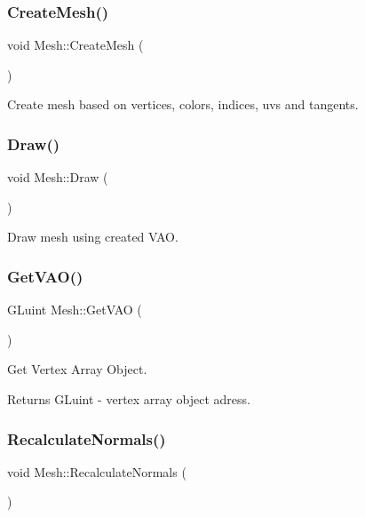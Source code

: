 \subsubsection{\texorpdfstring{CreateMesh()}{CreateMesh()}}
{\footnotesize\ttfamily void Mesh\+::\+Create\+Mesh (\begin{DoxyParamCaption}{ }\end{DoxyParamCaption})}



Create mesh based on vertices, colors, indices, uvs and tangents. 

\mbox{\label{class_mesh_afdd95c079fd0442afef8a6c421c8bfc9}} 
\subsubsection{\texorpdfstring{Draw()}{Draw()}}
{\footnotesize\ttfamily void Mesh\+::\+Draw (\begin{DoxyParamCaption}{ }\end{DoxyParamCaption})}



Draw mesh using created V\+AO. 

\mbox{\label{class_mesh_ad4917bc56c71f31974af4be3eb90a390}} 
\subsubsection{\texorpdfstring{GetVAO()}{GetVAO()}}
{\footnotesize\ttfamily G\+Luint Mesh\+::\+Get\+V\+AO (\begin{DoxyParamCaption}{ }\end{DoxyParamCaption})\hspace{0.3cm}{\ttfamily [inline]}}



Get Vertex Array Object. 

\begin{DoxyReturn}{Returns}
G\+Luint -\/ vertex array object adress. 
\end{DoxyReturn}
\mbox{\label{class_mesh_a2688a608e0185faef28105fae57ad76d}} 
\subsubsection{\texorpdfstring{RecalculateNormals()}{RecalculateNormals()}}
{\footnotesize\ttfamily void Mesh\+::\+Recalculate\+Normals (\begin{DoxyParamCaption}{ }\end{DoxyParamCaption})}



